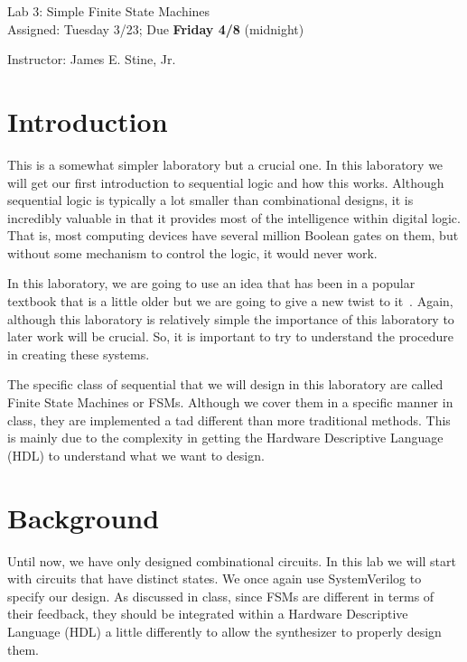 \documentclass{article}
\newcommand{\myassignment}{Lab 3: Simple Finite State Machines}
\newcommand{\myduedate}{Assigned: Tuesday 3/23; Due \textbf{Friday 4/8} (midnight)}
\newcommand{\myinstructor}{Instructor: James E. Stine, Jr.}
\begin{document}
\begin{center}
  {\huge \myassignment} \\
  {\large \myduedate} \\
  \begin{flushright}
  \myinstructor \\
  \end{flushright}
\end{center}

\section{Introduction}

This is a somewhat simpler laboratory but a crucial one.  In this
laboratory we will get our first introduction to sequential logic and
how this works.  Although sequential logic is typically a lot smaller
than combinational designs, it is incredibly valuable in that it
provides most of the intelligence within digital logic.  That is, most
computing devices have several million Boolean gates on them, but
without some mechanism to control the logic, it would never work.

In this laboratory, we are going to use an idea that has been in a
popular textbook that is a little older but we are going to give a new
twist to it~\cite{DBLP:books/daglib/0067158}.  Again, although this
laboratory is relatively simple the importance of this laboratory to
later work will be crucial.  So, it is important to try to
understand the procedure in creating these systems.

The specific class of sequential that we will design in this
laboratory are called Finite State Machines or FSMs.  Although we cover them
in a specific manner in class, they are implemented a tad different
than more traditional methods.  This is mainly due to the complexity
in getting the Hardware Descriptive Language (HDL) to understand what
we want to design.

\section{Background}

Until now, we have only designed combinational circuits. In this lab
we will start with circuits that have distinct states. We once again use
SystemVerilog to specify our design.  As discussed in class, since
FSMs are different in terms of their feedback, they should be
integrated within a Hardware Descriptive Language (HDL) a little
differently to allow the synthesizer to properly design them.
\end{document}
